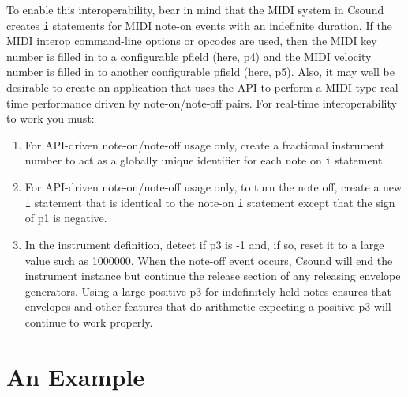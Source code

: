 \documentclass[12pt,letterpaper,onecolumn]{scrartcl}
\begin{document}
\begin{enumerate}
To enable this interoperability, bear in mind that the MIDI system in Csound creates \texttt{i} statements for MIDI note-on events with an indefinite duration. If the MIDI interop command-line options or opcodes are used, then the MIDI key number is filled in to a configurable pfield (here, p4) and the MIDI velocity number is filled in to another configurable pfield (here, p5). Also, it may well be desirable to create an application that uses the API to perform a MIDI-type real-time performance driven by note-on/note-off pairs. For real-time interoperability to work you must:

\begin{enumerate}
    \item For API-driven note-on/note-off usage only, create a fractional instrument number to act as a globally unique identifier for each note on \texttt{i} statement.
    \item For API-driven note-on/note-off usage only, to turn the note off, create a new \texttt{i} statement that is identical to the note-on \texttt{i} statement except that the sign of p1 is negative.
    \item In the instrument definition, detect if p3 is -1 and, if so, reset it to a large value such as 1000000. When the note-off event occurs, Csound will end the instrument instance but continue the release section of any releasing envelope generators. Using a large positive p3 for indefinitely held notes ensures that envelopes and other features that do arithmetic expecting a positive p3 will continue to work properly.
\end{enumerate}
		
\end{enumerate}
\section{An Example}
\label{sec:AnExample}




\newpage

\end{document}
